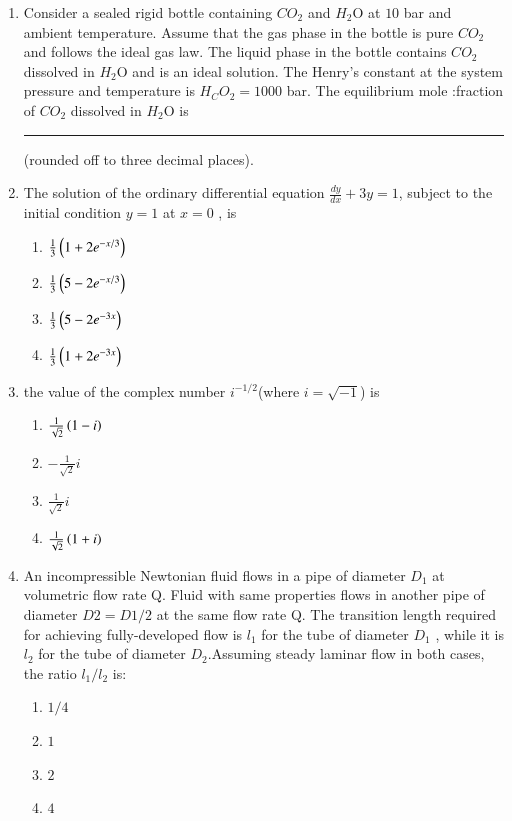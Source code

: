 \documentclass[journal,12pt,onecolumn]{IEEEtran}
\theoremstyle{remark}
\begin{document}
\begin{enumerate}
    \item Consider a sealed rigid bottle containing $CO_2$ and $H_2$O at $10$ bar and ambient temperature. Assume that the gas phase in the bottle is pure $CO_2$ and follows the ideal gas law. The liquid phase in the bottle contains $CO_2$ dissolved in $H_2$O and is an ideal solution. The Henry's constant at the system pressure and temperature is $H_CO_2 = 1000$ bar. The equilibrium mole :fraction of $CO_2$ dissolved in $H_2$O is \rule{1cm}{0.1mm} (rounded off to three decimal places).   

    \item 
        The solution of the ordinary differential equation $\frac{dy}{dx} + 3y = 1$, subject to the initial condition $y = 1$ at $x = 0$ , is 
     
    
\begin{multicols}{2}
    \begin{enumerate}
        \item $\frac{1}{3}\left(1 + 2e^{-x/3}\right)$
        \item $\frac{1}{3}\left(5 - 2e^{-x/3}\right)$
        \item $\frac{1}{3}\left(5 - 2e^{-3x}\right)$
        \item $\frac{1}{3}\left(1 + 2e^{-3x}\right)$
    \end{enumerate}
\end{multicols}

    \item 
        the value of the complex number ${i}^{-1/2}$(where ${i} = \sqrt{-1}$) is
    

\begin{multicols}{4}
    \begin{enumerate}
    
    \item $\frac{1}{\sqrt{2}}\left(1 -i\right)$
    \item $-\frac{1}{\sqrt{2}}i$
    \item $\frac{1}{\sqrt{2}}i$
    \item $\frac{1}{\sqrt{2}}\left(1+i\right)$
    \end{enumerate}
\end{multicols}
\newpage
    \item An incompressible Newtonian fluid flows in a pipe of diameter $D_1$ at volumetric flow rate Q. Fluid with same properties flows in another pipe of diameter $D2 = D1 / 2$ at the same flow rate Q. The transition length required for achieving fully-developed flow is $l_1$ for the tube of diameter $D_1$ , while it is $l_2$ for the tube of diameter $D_2$.Assuming steady laminar flow in both cases, the ratio $l_1/l_2$ is: 
    \begin{multicols}{4}
\begin{enumerate}
    \item $1/4$
    \item $1$
    \item $2$
    \item $4$
\end{enumerate}
\end{multicols}


\end{enumerate}
\end{document}
